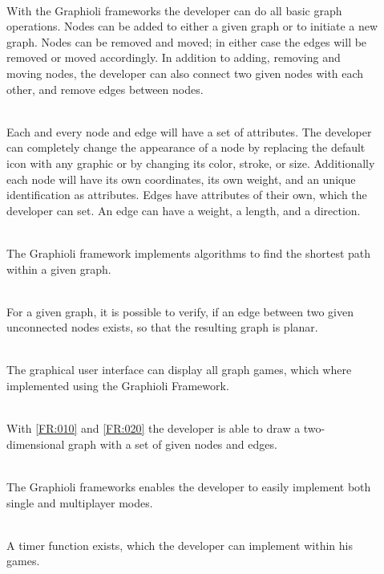 \begin{description}
  	\item[] {\bf {}}  \\
	With the Graphioli frameworks the developer can do all basic graph operations. Nodes can be added to either a given graph or to initiate a new graph. Nodes can be removed and moved; in either case the edges will be removed or moved accordingly. In addition to adding, removing and moving nodes, the developer can also connect two given nodes with each other, and remove edges between nodes.
	\item[] {\bf {}}  \\
	Each and every node and edge will have a set of attributes. The developer can completely change the appearance of a node by replacing the default icon with any graphic or by changing its color, stroke, or size. Additionally each node will have its own coordinates, its own weight, and an unique identification as attributes. Edges have attributes of their own, which the developer can set. An edge can have a weight, a length, and a direction.
	\item[] {\bf {}}  \\
	The Graphioli framework implements algorithms to find the shortest path within a given graph.
	\item[] {\bf  {}}  \\
	For a given graph, it is possible to verify, if an edge between two given unconnected nodes exists, so that the resulting graph is planar.
 	\item[] {\bf {}}  \\
 	The graphical user interface  can display all graph games, which where implemented using the Graphioli Framework.
	\item[] {\bf {}}  \\
  	With \ref{FR:010} and \ref{FR:020} the developer is able to draw a two-dimensional graph with a set of given nodes and edges.
	\item[] {\bf {}}  \\
	The Graphioli frameworks enables the developer to easily implement both single and multiplayer modes.
	\item[] {\bf {}} \\
	A timer function exists, which the developer can implement within his games.
\end{description}

